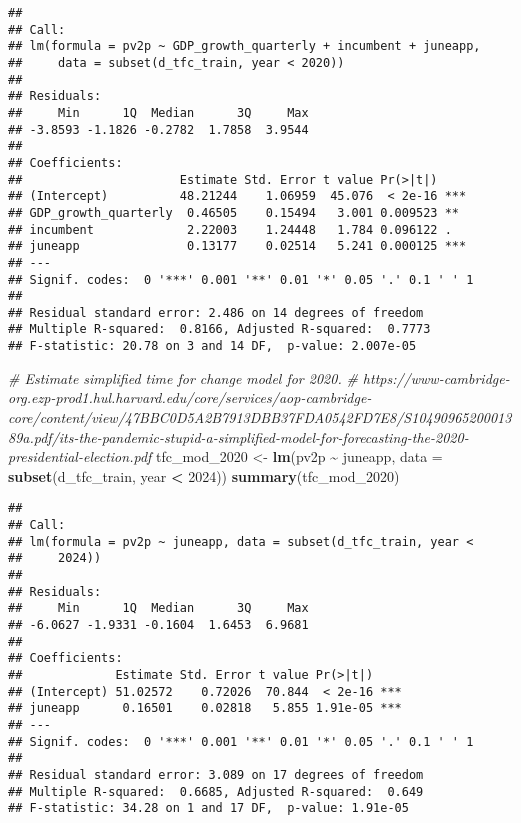 \documentclass[
]{article}
\newenvironment{Shaded}{\begin{snugshade}}{\end{snugshade}}
\newcommand{\AttributeTok}[1]{\textcolor[rgb]{0.13,0.29,0.53}{#1}}
\newcommand{\CommentTok}[1]{\textcolor[rgb]{0.56,0.35,0.01}{\textit{#1}}}
\newcommand{\DecValTok}[1]{\textcolor[rgb]{0.00,0.00,0.81}{#1}}
\newcommand{\FunctionTok}[1]{\textcolor[rgb]{0.13,0.29,0.53}{\textbf{#1}}}
\newcommand{\NormalTok}[1]{#1}
\newcommand{\OtherTok}[1]{\textcolor[rgb]{0.56,0.35,0.01}{#1}}
\newcommand{\SpecialCharTok}[1]{\textcolor[rgb]{0.81,0.36,0.00}{\textbf{#1}}}
\begin{document}
\begin{verbatim}
## 
## Call:
## lm(formula = pv2p ~ GDP_growth_quarterly + incumbent + juneapp, 
##     data = subset(d_tfc_train, year < 2020))
## 
## Residuals:
##     Min      1Q  Median      3Q     Max 
## -3.8593 -1.1826 -0.2782  1.7858  3.9544 
## 
## Coefficients:
##                      Estimate Std. Error t value Pr(>|t|)    
## (Intercept)          48.21244    1.06959  45.076  < 2e-16 ***
## GDP_growth_quarterly  0.46505    0.15494   3.001 0.009523 ** 
## incumbent             2.22003    1.24448   1.784 0.096122 .  
## juneapp               0.13177    0.02514   5.241 0.000125 ***
## ---
## Signif. codes:  0 '***' 0.001 '**' 0.01 '*' 0.05 '.' 0.1 ' ' 1
## 
## Residual standard error: 2.486 on 14 degrees of freedom
## Multiple R-squared:  0.8166, Adjusted R-squared:  0.7773 
## F-statistic: 20.78 on 3 and 14 DF,  p-value: 2.007e-05
\end{verbatim}

\begin{Shaded}
\begin{Highlighting}[]
\CommentTok{\# Estimate simplified time for change model for 2020. }
\CommentTok{\# https://www{-}cambridge{-}org.ezp{-}prod1.hul.harvard.edu/core/services/aop{-}cambridge{-}core/content/view/47BBC0D5A2B7913DBB37FDA0542FD7E8/S1049096520001389a.pdf/its{-}the{-}pandemic{-}stupid{-}a{-}simplified{-}model{-}for{-}forecasting{-}the{-}2020{-}presidential{-}election.pdf}
\NormalTok{tfc\_mod\_2020 }\OtherTok{\textless{}{-}} \FunctionTok{lm}\NormalTok{(pv2p }\SpecialCharTok{\textasciitilde{}}\NormalTok{ juneapp, }
                   \AttributeTok{data =} \FunctionTok{subset}\NormalTok{(d\_tfc\_train, year }\SpecialCharTok{\textless{}} \DecValTok{2024}\NormalTok{))}
\FunctionTok{summary}\NormalTok{(tfc\_mod\_2020)}
\end{Highlighting}
\end{Shaded}

\begin{verbatim}
## 
## Call:
## lm(formula = pv2p ~ juneapp, data = subset(d_tfc_train, year < 
##     2024))
## 
## Residuals:
##     Min      1Q  Median      3Q     Max 
## -6.0627 -1.9331 -0.1604  1.6453  6.9681 
## 
## Coefficients:
##             Estimate Std. Error t value Pr(>|t|)    
## (Intercept) 51.02572    0.72026  70.844  < 2e-16 ***
## juneapp      0.16501    0.02818   5.855 1.91e-05 ***
## ---
## Signif. codes:  0 '***' 0.001 '**' 0.01 '*' 0.05 '.' 0.1 ' ' 1
## 
## Residual standard error: 3.089 on 17 degrees of freedom
## Multiple R-squared:  0.6685, Adjusted R-squared:  0.649 
## F-statistic: 34.28 on 1 and 17 DF,  p-value: 1.91e-05
\end{verbatim}
\end{document}
